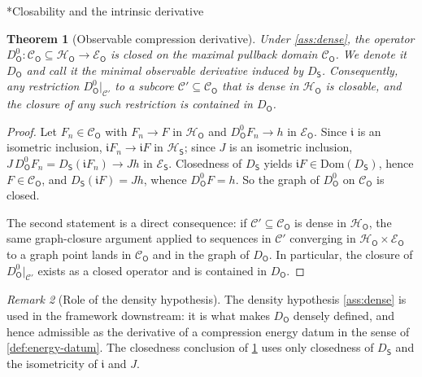 \documentclass[11pt,reqno]{amsart}
\makeatletter
\renewcommand\subsection{\@startsection{subsection}{2}%
  \z@{.7\linespacing}{.5\linespacing}%
  {\normalfont\centering\scshape}}
\theoremstyle{plain}
\newtheorem{theorem}{Theorem}[section]
\theoremstyle{definition}
\theoremstyle{remark}
\newtheorem{remark}[theorem]{Remark}
\newcommand{\Hilb}{\mathcal{H}}
\newcommand{\Dom}{\mathrm{Dom}}
\newcommand{\Energy}{\mathcal{E}}
\newcommand{\Source}{\mathsf{S}}
\newcommand{\Obs}{\mathsf{O}}
\renewcommand{\iota}{\mathfrak{i}}
\makeatother
\begin{document}
\subsection*{Closability and the intrinsic derivative}

\begin{theorem}[Observable compression derivative]\label{thm:compression}
Under \cref{ass:dense}, the operator
$D_\Obs^{0}\colon\mathcal C_\Obs\subseteq\Hilb_\Obs\to\Energy_\Obs$ is
closed on the maximal pullback domain $\mathcal C_\Obs$. We denote it
$D_\Obs$ and call it the \emph{minimal observable derivative} induced by
$D_\Source$. Consequently, any restriction
$D_\Obs^{0}|_{\mathcal C'}$ to a subcore
$\mathcal C'\subseteq\mathcal C_\Obs$ that is dense in $\Hilb_\Obs$ is
closable, and the closure of any such restriction is contained in
$D_\Obs$.
\end{theorem}

\begin{proof}
Let $F_n\in\mathcal C_\Obs$ with $F_n\to F$ in $\Hilb_\Obs$ and
$D_\Obs^{0}F_n\to h$ in $\Energy_\Obs$. Since $\iota$ is an isometric
inclusion, $\iota F_n\to\iota F$ in $\Hilb_\Source$; since $J$ is an
isometric inclusion,
$J\,D_\Obs^{0}F_n=D_\Source(\iota F_n)\to Jh$ in $\Energy_\Source$.
Closedness of $D_\Source$ yields $\iota F\in\Dom(D_\Source)$, hence
$F\in\mathcal C_\Obs$, and $D_\Source(\iota F)=Jh$, whence
$D_\Obs^{0}F=h$. So the graph of $D_\Obs^{0}$ on $\mathcal C_\Obs$ is
closed.

The second statement is a direct consequence: if
$\mathcal C'\subseteq\mathcal C_\Obs$ is dense in $\Hilb_\Obs$, the same
graph-closure argument applied to sequences in $\mathcal C'$ converging
in $\Hilb_\Obs\times\Energy_\Obs$ to a graph point lands in
$\mathcal C_\Obs$ and in the graph of $D_\Obs$. In particular, the
closure of $D_\Obs^{0}|_{\mathcal C'}$ exists as a closed operator and
is contained in $D_\Obs$.
\end{proof}

\begin{remark}[Role of the density hypothesis]\label{rem:density-role}
The density hypothesis \cref{ass:dense} is used in the framework
downstream: it is what makes $D_\Obs$ densely defined, and hence
admissible as the derivative of a compression energy datum in the
sense of \cref{def:energy-datum}. The closedness conclusion of
\cref{thm:compression} uses only closedness of $D_\Source$ and the
isometricity of $\iota$ and $J$.
\end{remark}
\end{document}
